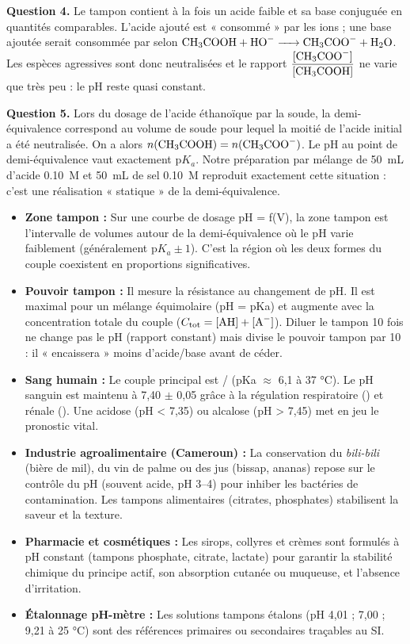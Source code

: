\documentclass[11pt]{article}
\begin{document}
\begin{exoresolu}
\textbf{Question 4.} Le tampon contient à la fois un acide faible et sa base conjuguée en quantités comparables. L'acide ajouté est « consommé » par les ions  ; une base ajoutée serait consommée par  selon $\ce{CH3COOH + HO- -> CH3COO- + H2O}$. Les espèces agressives sont donc neutralisées et le rapport $\dfrac{[\ce{CH3COO-}]}{[\ce{CH3COOH}]}$ ne varie que très peu : le pH reste quasi constant.

\textbf{Question 5.} Lors du dosage de l'acide éthanoïque par la soude, la demi-équivalence correspond au volume de soude pour lequel la moitié de l'acide initial a été neutralisée. On a alors $n(\ce{CH3COOH}) = n(\ce{CH3COO-})$. Le pH au point de demi-équivalence vaut exactement $\mathrm{p}K_a$. Notre préparation par mélange de \SI{50}{mL} d'acide \SI{0,10}{M} et \SI{50}{mL} de sel \SI{0,10}{M} reproduit exactement cette situation : c'est une réalisation « statique » de la demi-équivalence.
\end{exoresolu}

\begin{savaistu}
\begin{itemize}
\item \textbf{Zone tampon :} Sur une courbe de dosage pH = f(V), la zone tampon est l'intervalle de volumes autour de la demi-équivalence où le pH varie faiblement (généralement $\mathrm{p}K_a \pm 1$). C'est la région où les deux formes du couple coexistent en proportions significatives.
\item \textbf{Pouvoir tampon :} Il mesure la résistance au changement de pH. Il est maximal pour un mélange équimolaire (pH = pKa) et augmente avec la concentration totale du couple ($C_{\text{tot}} = [\ce{AH}] + [\ce{A-}]$). Diluer le tampon 10 fois ne change pas le pH (rapport constant) mais divise le pouvoir tampon par 10 : il « encaissera » moins d'acide/base avant de céder.
\item \textbf{Sang humain :} Le couple principal est / (pKa $\approx$ 6,1 à 37 °C). Le pH sanguin est maintenu à 7,40 $\pm$ 0,05 grâce à la régulation respiratoire () et rénale (). Une acidose (pH < 7,35) ou alcalose (pH > 7,45) met en jeu le pronostic vital.
\item \textbf{Industrie agroalimentaire (Cameroun) :} La conservation du \emph{bili-bili} (bière de mil), du vin de palme ou des jus (bissap, ananas) repose sur le contrôle du pH (souvent acide, pH 3--4) pour inhiber les bactéries de contamination. Les tampons alimentaires (citrates, phosphates) stabilisent la saveur et la texture.
\item \textbf{Pharmacie et cosmétiques :} Les sirops, collyres et crèmes sont formulés à pH constant (tampons phosphate, citrate, lactate) pour garantir la stabilité chimique du principe actif, son absorption cutanée ou muqueuse, et l'absence d'irritation.
\item \textbf{Étalonnage pH-mètre :} Les solutions tampons étalons (pH 4,01 ; 7,00 ; 9,21 à 25 °C) sont des références primaires ou secondaires traçables au SI.
\end{itemize}
\end{savaistu}
\end{document}
